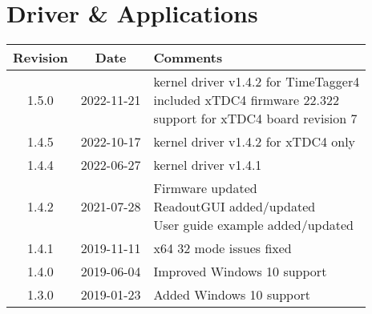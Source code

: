 \section{Driver \& Applications}
\begin{tabularx}{\textwidth}{|c|c|X|}
    \hline
    Revision & Date & Comments\\
    \hline\hline
    \hline
    \hypertarget{drvrev}{1.5.0} & 2022-11-21 &
    \makecell[l] {
        kernel driver v1.4.2 for TimeTagger4 \\*
        included xTDC4 firmware 22.322 \\*
        support for xTDC4 board revision 7
    }\\
    \hline
    {1.4.5} & 2022-10-17 &
        kernel driver v1.4.2 for xTDC4 only\\
    \hline
    {1.4.4} & 2022-06-27 &
        kernel driver v1.4.1\\
    \hline
    1.4.2 & 2021-07-28 &
    \makecell[l]{
        Firmware updated \\*
        ReadoutGUI added/updated \\*
        User guide example added/updated \\*
    }\\
    \hline
    {1.4.1} & 2019-11-11 & x64 32 mode issues fixed\\
    \hline
    {1.4.0} & 2019-06-04 & Improved Windows 10 support\\
    \hline
    {1.3.0} & 2019-01-23 & Added Windows 10 support\\
    \hline
\end{tabularx}
